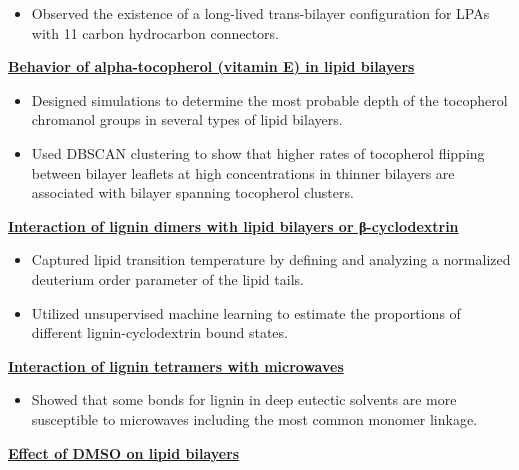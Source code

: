 \begin{cventries}
{\begin{cvitems}
\begin{itemize}
                \item {Observed the existence of a long-lived trans-bilayer configuration for LPAs with 11 carbon hydrocarbon connectors.}
                \end{itemize}
            \item {\textbf{\underline{Behavior of alpha-tocopherol (vitamin E) in lipid bilayers}}}
                \vspace{2pt}
                \begin{itemize}
                \item {Designed simulations to determine the most probable depth of the tocopherol chromanol groups in several types of lipid bilayers.}
                \item {Used DBSCAN clustering to show that higher rates of tocopherol flipping between bilayer leaflets at high concentrations in thinner bilayers are associated with bilayer spanning tocopherol clusters.}
                \end{itemize}
            \item {\textbf{\underline{Interaction of lignin dimers with lipid bilayers or β-cyclodextrin}}}
                \vspace{2pt}
                \begin{itemize}
                    \item {Captured lipid transition temperature by defining and analyzing a normalized deuterium order parameter of the lipid tails.}
                    \item {Utilized unsupervised machine learning to estimate the proportions of different lignin-cyclodextrin bound states.}
                \end{itemize}            
            \item {\textbf{\underline{Interaction of lignin tetramers with microwaves}}}
                \vspace{2pt}
                \begin{itemize}
                    \item {Showed that some bonds for lignin in deep eutectic solvents are more susceptible to microwaves including the most common monomer linkage.}
                \end{itemize}   
            \item {\textbf{\underline{Effect of DMSO on lipid bilayers}}}

\end{cvitems}}
\end{cventries}

